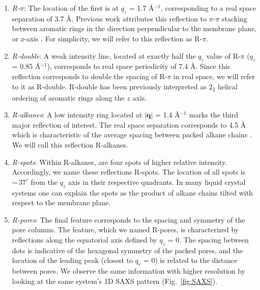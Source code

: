 \documentclass[journal=jpcbfk,manuscript=article]{achemso}
\begin{document}
  \begin{enumerate} 
  
	\item \textit{R-$\pi$}: The location of the first is at $q_z$ = 1.7
	\AA$^{-1}$, corresponding to a real space separation of 3.7 {\AA}. Previous
	work attributes this reflection to $\pi$-$\pi$
	stacking between aromatic rings in the direction perpendicular to the membrane
	plane, or z-axis \cite{feng_scalable_2014}. For simplicity, we will refer to
	this reflection as R-$\pi$.
 
	\item \textit{R-double}: A weak intensity line, located at exactly half
	the $q_z$ value of R-$\pi$ ($q_z$ = 0.85 \AA$^{-1}$), corresponds to real
	space periodicity of 7.4 \AA. Since this reflection corresponds to double
	the spacing of R-$\pi$ in real space, we will refer to it as R-double. 
	R-double has been previously interpreted as 2\textsubscript{1} helical ordering of aromatic
	rings along the $z$ axis\cite{feng_scalable_2014}.

	\item \textit{R-alkanes}: A low intensity ring located at $|\mathbf{q}|$ = 1.4
	\AA$^{-1}$ marks the third major reflection of interest. The real space
	separation corresponds to 4.5 \AA~ which is characteristic of the average
	spacing between packed alkane chains \cite{mcintosh_organization_1980}. We will
	call this reflection R-alkanes.

	\item \textit{R-spots}: Within R-alkanes, are four spots of higher
	relative intensity.  Accordingly, we name these reflections R-spots. The
	location of all spots is $\sim\,37^{\circ}$ from the $q_z$ axis in their
	respective quadrants. In many liquid crystal systems one can explain the spots
	as the product of alkane chains tilted with respect to the membrane
	plane\cite{govind_simple_2001}.
 
	\item \textit{R-pores}: The final feature corresponds to the spacing
	and symmetry of the pore columns. The feature, which we named R-pores, 
	is characterized by reflections along the equatorial axis defined by $q_z$ = 0.
	The spacing between dots is indicative of the hexagonal symmetry of the 
	packed pores, and the location of the leading peak (closest to $q_r$ = 0)
	is related to the distance between pores. We observe the same information
	with higher resolution by looking at the same system's 1D SAXS pattern 
	(Fig.~\ref{fig:SAXS}). 

  \end{enumerate}
\end{document}
